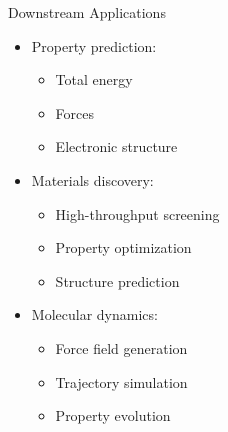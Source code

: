 \begin{frame}{Downstream Applications}
    \begin{itemize}
        \item Property prediction:
        \begin{itemize}
            \item Total energy
            \item Forces
            \item Electronic structure
        \end{itemize}
        \item Materials discovery:
        \begin{itemize}
            \item High-throughput screening
            \item Property optimization
            \item Structure prediction
        \end{itemize}
        \item Molecular dynamics:
        \begin{itemize}
            \item Force field generation
            \item Trajectory simulation
            \item Property evolution
        \end{itemize}
    \end{itemize}
\end{frame} 